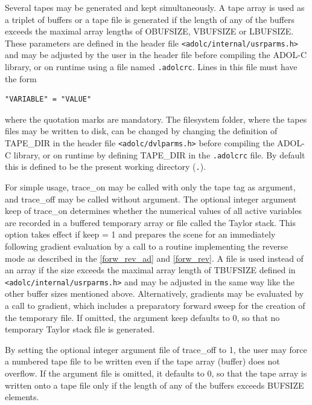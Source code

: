 \documentclass[11pt,twoside]{article}
\begin{document}
Several tapes may be generated and kept simultaneously.
A tape array is used as a triplet of buffers or a tape file is generated if
the length of any of the buffers exceeds the maximal array lengths of 
{\sf OBUFSIZE}, {\sf VBUFSIZE} or {\sf LBUFSIZE}. These parameters are
defined in the header file \verb=<adolc/internal/usrparms.h>=
and may be adjusted by the user in the header file before compiling
the ADOL-C library, or on runtime using a file named \verb=.adolcrc=. 
Lines in this file must have the form
\begin{verbatim}
"VARIABLE" = "VALUE"
\end{verbatim}
where the quotation marks are mandatory.
The filesystem folder, where the tapes files may be written to disk, 
can be changed by changing the definition of {\sf TAPE\_DIR} in
the header file \verb=<adolc/dvlparms.h>= before 
compiling the ADOL-C library, or on runtime by defining {\sf
  TAPE\_DIR} in the \verb=.adolcrc= file. By default this is defined
to be the present working directory (\verb=.=).

For simple usage, {\sf trace\_on} may be called with only the tape
{\sf tag} as argument, and {\sf trace\_off} may be called 
without argument. The optional integer argument {\sf keep} of 
{\sf trace\_on} determines whether the numerical values of all
active variables are recorded in a buffered temporary array or file
called the Taylor stack. 
This option takes effect if
{\sf keep} = 1 and prepares the scene for an immediately following
gradient evaluation by a call to a routine implementing the reverse mode
as described in the \autoref{forw_rev_ad} and \autoref{forw_rev}. A
file is used instead of an array if the size exceeds the maximal array
length of {\sf TBUFSIZE} defined in \verb=<adolc/internal/usrparms.h>= and may
be adjusted in the same way like the other buffer sizes mentioned above.
Alternatively, gradients may be evaluated by a call
to {\sf gradient}, which includes a preparatory forward sweep
for the creation of the temporary file. If omitted, the argument 
{\sf  keep} defaults to 0, so that no temporary
Taylor stack file is generated. 

By setting the optional integer argument {\sf file} of 
{\sf  trace\_off} to 1, the user may force a numbered  tape
file to be written even if the tape array (buffer) does not overflow.
If the argument {\sf file} is omitted, it 
defaults to 0, so that the tape array is written onto a tape file only 
if the length of any of the buffers exceeds {\sf [OLVT]BUFSIZE} elements.
\end{document}
